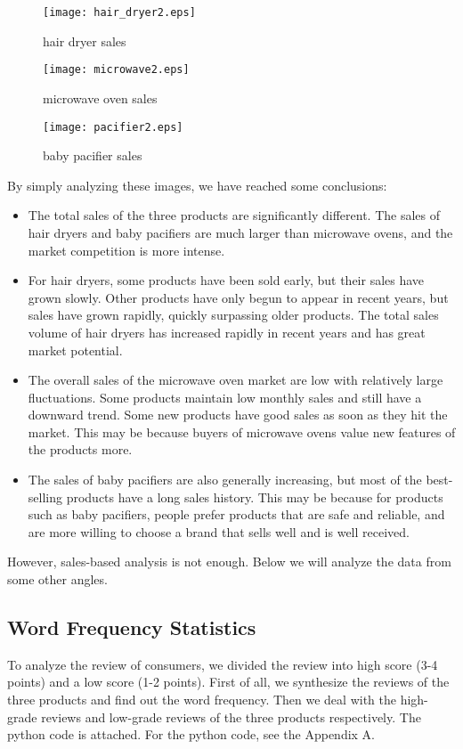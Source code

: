 \documentclass{mcmthesis}
\begin{document}
	\begin{figure}[H]
		\small
		\centering
		\texttt{[image: hair\_dryer2.eps]}
		\caption{hair dryer sales} \label{hair dryer sales}
	\end{figure}
	
	\begin{figure}[H]
		\small
		\centering
		\texttt{[image: microwave2.eps]}
		\caption{microwave  oven sales} \label{microwave sales}
	\end{figure}
	
	\begin{figure}[H]
		\small
		\centering
		\texttt{[image: pacifier2.eps]}
		\caption{baby pacifier sales} \label{pacifier sales}
	\end{figure}
	
	By simply analyzing these images, we have reached some conclusions:
	\begin{itemize}
		\item
		The total sales of the three products are significantly different. The sales of hair dryers and baby pacifiers are much larger than microwave ovens, and the market competition is more intense.
		\item
		For hair dryers, some products have been sold early, but their sales have grown slowly. Other products have only begun to appear in recent years, but sales have grown rapidly, quickly surpassing older products. The total sales volume of hair dryers has increased rapidly in recent years and has great market potential.
		\item
		The overall sales of the microwave oven market are low with relatively large fluctuations. Some products maintain low monthly sales and still have a downward trend. Some new products have good sales as soon as they hit the market. This may be because buyers of microwave ovens value new features of the products more.
		\item
		The sales of baby pacifiers are also generally increasing, but most of the best-selling products have a long sales history. This may be because for products such as baby pacifiers, people prefer products that are safe and reliable, and are more willing to choose a brand that sells well and is well received.
	\end{itemize}
	
	However, sales-based analysis is not enough. Below we will analyze the data from some other angles.
	
	\subsection{Word Frequency Statistics}
	To analyze the review of consumers, we divided the review into high score (3-4 points) and a low score (1-2 points). First of all, we synthesize the reviews of the three products and find out the word frequency. Then we deal with the high-grade reviews and low-grade reviews of the three products respectively. The python code is attached. For the python code, see the Appendix A.
\end{document}

